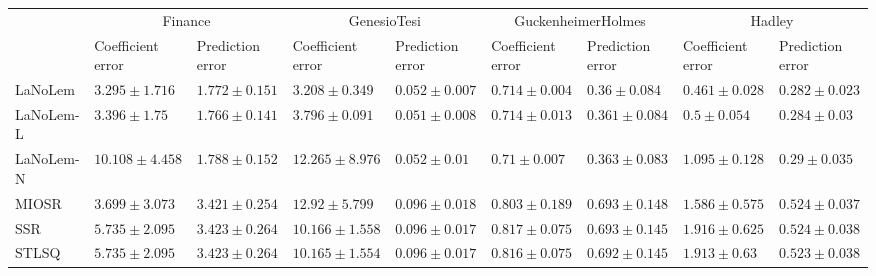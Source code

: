 \begin{table*}
{\begin{tabular}{lllllllll}
 & \multicolumn{2}{c}{Finance} & \multicolumn{2}{c}{GenesioTesi} & \multicolumn{2}{c}{GuckenheimerHolmes} & \multicolumn{2}{c}{Hadley} \\
 & Coefficient error & Prediction error & Coefficient error & Prediction error & Coefficient error & Prediction error & Coefficient error & Prediction error \\
\midrule
LaNoLem & $\mathbf{3.295}\pm 1.716$ & $1.772\pm 0.151$ & $\mathbf{3.208}\pm 0.349$ & $0.052\pm 0.007$ & $0.714\pm 0.004$ & $\mathbf{0.36}\pm 0.084$ & $\mathbf{0.461}\pm 0.028$ & $\mathbf{0.282}\pm 0.023$ \\
LaNoLem-L & $3.396\pm 1.75$ & $\mathbf{1.766}\pm 0.141$ & $3.796\pm 0.091$ & $\mathbf{0.051}\pm 0.008$ & $0.714\pm 0.013$ & $0.361\pm 0.084$ & $0.5\pm 0.054$ & $0.284\pm 0.03$ \\
LaNoLem-N & $10.108\pm 4.458$ & $1.788\pm 0.152$ & $12.265\pm 8.976$ & $0.052\pm 0.01$ & $\mathbf{0.71}\pm 0.007$ & $0.363\pm 0.083$ & $1.095\pm 0.128$ & $0.29\pm 0.035$ \\
MIOSR & $3.699\pm 3.073$ & $3.421\pm 0.254$ & $12.92\pm 5.799$ & $0.096\pm 0.018$ & $0.803\pm 0.189$ & $0.693\pm 0.148$ & $1.586\pm 0.575$ & $0.524\pm 0.037$ \\
SSR & $5.735\pm 2.095$ & $3.423\pm 0.264$ & $10.166\pm 1.558$ & $0.096\pm 0.017$ & $0.817\pm 0.075$ & $0.693\pm 0.145$ & $1.916\pm 0.625$ & $0.524\pm 0.038$ \\
STLSQ & $5.735\pm 2.095$ & $3.423\pm 0.264$ & $10.165\pm 1.554$ & $0.096\pm 0.017$ & $0.816\pm 0.075$ & $0.692\pm 0.145$ & $1.913\pm 0.63$ & $0.523\pm 0.038$ \\

\midrule


\end{tabular}}
\end{table*}
